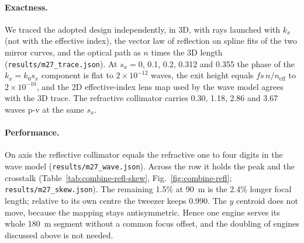 \paragraph{Exactness.} We traced the adopted design independently, in 3D, with rays launched with $k_x$ (not with the effective index), the vector law of reflection on spline fits of the two mirror curves, and the optical path as $n$ times the 3D length (\texttt{results/\allowbreak m27\_trace.json}). At $s_x=0$, 0.1, 0.2, 0.312 and 0.355 the phase of the $k_x=k_0s_x$ component is flat to $2\times10^{-12}$ waves, the exit height equals $fs\,n/n_\mathrm{eff}$ to $2\times10^{-10}$, and the 2D effective-index lens map used by the wave model agrees with the 3D trace. The refractive collimator carries 0.30, 1.18, 2.86 and 3.67 waves p-v at the same $s_x$.

\paragraph{Performance.} On axis the reflective collimator equals the refractive one to four digits in the wave model (\texttt{results/\allowbreak m27\_wave.json}). Across the row it holds the peak and the crosstalk (Table~\ref{tab:combine-refl-skew}, Fig.~\ref{fig:combine-refl}; \texttt{results/\allowbreak m27\_skew.json}). The remaining 1.5\% at 90~\textmu m is the 2.4\% longer focal length; relative to its own centre the tweezer keeps 0.990. The $y$ centroid does not move, because the mapping stays antisymmetric. Hence one engine serves its whole 180~\textmu m segment without a common focus offset, and the doubling of engines discussed above is not needed.

